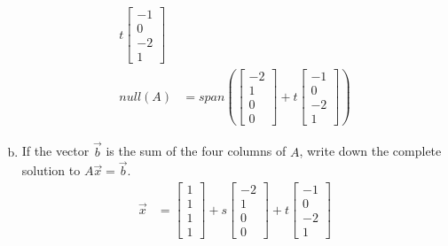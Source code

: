 \documentclass{math}
\begin{document}
\begin{enumerate}[(a)]
\begin{align*}
      t\begin{bmatrix}-1 \\ 0 \\ -2 \\ 1\end{bmatrix} \\
    null(A) &= span\left(\begin{bmatrix}-2 \\ 1 \\ 0 \\ 0\end{bmatrix}+
      t\begin{bmatrix}-1 \\ 0 \\ -2 \\ 1\end{bmatrix}\right)
  \end{align*}
  \item If the vector \( \vec{b} \) is the sum of the four columns of \( A \),
  write down the complete solution to \( A\vec{x} = \vec{b} \).
  \begin{align*}
    \vec{x} &= \begin{bmatrix}1 \\ 1 \\ 1 \\ 1\end{bmatrix}+
      s\begin{bmatrix}-2 \\ 1 \\ 0 \\ 0\end{bmatrix}+
      t\begin{bmatrix}-1 \\ 0 \\ -2 \\ 1\end{bmatrix}
  \end{align*}
\end{enumerate}
\end{document}
